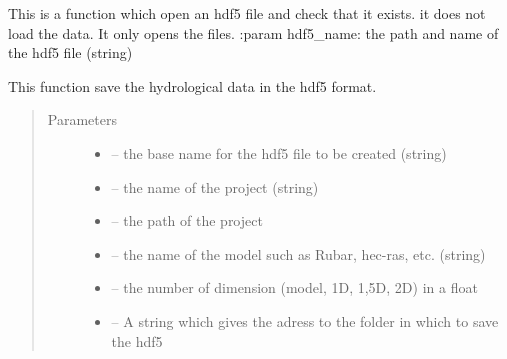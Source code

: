 \documentclass[letterpaper,10pt,english]{sphinxmanual}
\begin{document}

\begin{fulllineitems}
\label{\detokenize{index:src.load_hdf5.open_hdf5}}
This is a function which open an hdf5 file and check that it exists. it does not load the data. It only opens the
files.
:param hdf5\_name: the path and name of the hdf5 file (string)

\end{fulllineitems}


\begin{fulllineitems}
\label{\detokenize{index:src.load_hdf5.save_hdf5}}
This function save the hydrological data in the hdf5 format.
\begin{quote}\begin{description}
\item[{Parameters}] \leavevmode\begin{itemize}
\item {} 
 -- the base name for the hdf5 file to be created (string)

\item {} 
 -- the name of the project (string)

\item {} 
 -- the path of the project

\item {} 
 -- the name of the model such as Rubar, hec-ras, etc. (string)

\item {} 
 -- the number of dimension (model, 1D, 1,5D, 2D) in a float

\item {} 
 -- A string which gives the adress to the folder in which to save the hdf5


\end{itemize}
\end{description}
\end{quote}
\end{fulllineitems}
\end{document}
